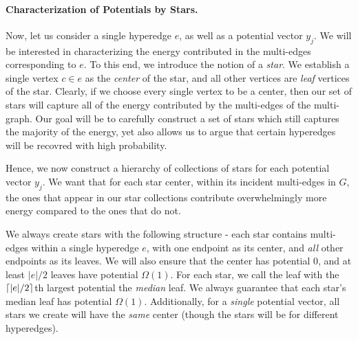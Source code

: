 \documentclass{article}
\begin{document}
\paragraph{Characterization of Potentials by Stars.}
{
Now, let us consider a single hyperedge $e$, as well as a potential vector $y_j$. We will be interested in characterizing the energy contributed in the multi-edges corresponding to $e$. To this end, we introduce the notion of a \emph{star}. We establish a single vertex $c \in e$ as the \emph{center} of the star, and all other vertices are \emph{leaf} vertices of the star. Clearly, if we choose every single vertex to be a center, then our set of stars will capture all of the energy contributed by the multi-edges of the multi-graph. Our goal will be to carefully construct a set of stars which still captures the majority of the energy, yet also allows us to argue that certain hyperedges will be recovred with high probability. 

Hence, we now construct a hierarchy of collections of stars for each potential vector $y_j$.
We want that for each star center,
within its incident multi-edges in $G$,
the ones that appear in our star collections
contribute overwhelmingly more energy compared to the ones that do not.

We always create stars with the following
structure - each star contains multi-edges within a single hyperedge $e$, with one endpoint
as its center, and \textit{all} other endpoints as its leaves.
We will also ensure that the center has potential $0$,
and at least $|e|/2$ leaves have potential $\Omega(1)$.
For each star,
we call the leaf with the $\left\lceil |e|/2 \right\rceil$th largest potential
the \textit{median} leaf.
We always guarantee that each star's median leaf has potential $\Omega(1)$.
Additionally,
for a \textit{single} potential vector,
all stars we create will have the \textit{same} center (though the stars will be for different hyperedges).

}
\end{document}
